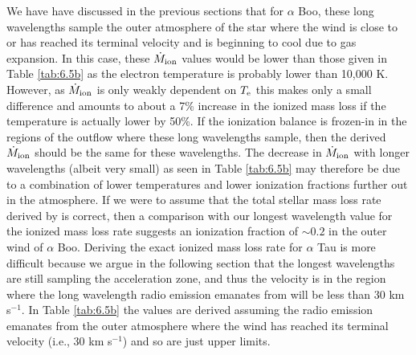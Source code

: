 We have have discussed in the previous sections that for $\alpha$ Boo, these long wavelengths sample the outer atmosphere of the star where the wind  is close to or has reached its terminal velocity and is beginning to cool due to gas expansion. In this case, these $\dot{M}_{\rm{ion}}$ values would be lower than those given in Table \ref{tab:6.5b} as the electron temperature is probably lower than 10,000 K. However, as $\dot{M}_{\rm{ion}}$  is only weakly dependent on $T_{\rm{e}}$ this makes only a small difference and amounts to about a 7\% increase in the ionized mass loss if the temperature is actually lower by 50\%. If the ionization balance is frozen-in in the regions of the outflow where these long wavelengths sample, then the derived $\dot{M}_{\rm{ion}}$ should be the same for these wavelengths. The decrease in $\dot{M}_{\rm{ion}}$ with longer wavelengths (albeit very small) as seen in Table \ref{tab:6.5b} may therefore be due to a combination of lower temperatures and lower ionization fractions further out in the atmosphere. If we were to assume that the total stellar mass loss rate derived by \cite{drake_1985} is correct, then a comparison with our longest wavelength value for the ionized mass loss rate suggests an ionization fraction of $\sim 0.2$ in the outer wind of $\alpha$ Boo. Deriving the exact ionized mass loss rate for $\alpha$ Tau is more difficult because we argue in the following section that the longest wavelengths are still sampling the acceleration zone, and thus the velocity is in the region where the long wavelength radio emission emanates from will be less than 30 km s$^{-1}$. In Table \ref{tab:6.5b} the values are derived assuming the radio emission emanates from the outer atmosphere where the wind has reached its terminal velocity (i.e., 30 km s$^{-1}$) and so are just upper limits.